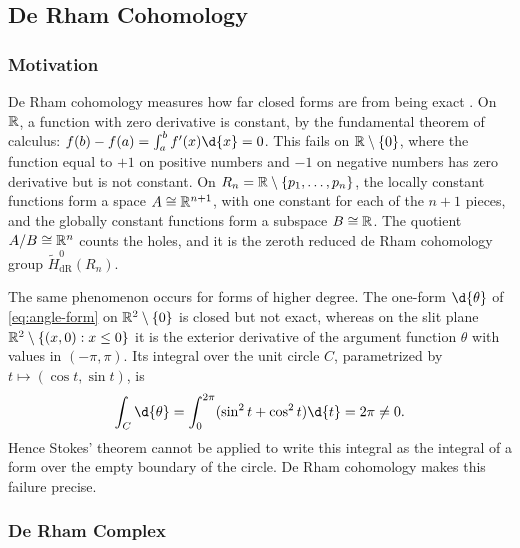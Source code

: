 \documentclass[a4paper,12pt]{article}
\begin{document}
\subsection{De Rham Cohomology}\label{subsec:de_rham_theory:de_rham_cohomology}

\subsubsection{Motivation}\label{subsubsec:de_rham_theory:de_rham_cohomology:motivation}

De Rham cohomology measures how far closed forms are from being exact \cite{tao2008differential}.
On $\mathbb{R}$, a function with zero derivative is constant, by the fundamental theorem of calculus: $f(b) - f(a) = \int_a^b f'(x) \d{x} = 0$.
This fails on $\mathbb{R} \setminus \{0\}$, where the function equal to $+1$ on positive numbers and $-1$ on negative numbers has zero derivative but is not constant.
On $R_n = \mathbb{R} \setminus \{p_1, \ldots, p_n\}$, the locally constant functions form a space $A \cong \mathbb{R}^{n+1}$, with one constant for each of the $n+1$ pieces, and the globally constant functions form a subspace $B \cong \mathbb{R}$.
The quotient $A/B \cong \mathbb{R}^n$ counts the holes, and it is the zeroth reduced de Rham cohomology group $\widetilde{H}^0_{\mathrm{dR}}(R_n)$.

The same phenomenon occurs for forms of higher degree.
The one-form $\d{\theta}$ of \eqref{eq:angle-form} on $\mathbb{R}^2 \setminus \{0\}$ is closed but not exact, whereas on the slit plane $\mathbb{R}^2 \setminus \{(x, 0) : x \leq 0\}$ it is the exterior derivative of the argument function $\theta$ with values in $(-\pi, \pi)$.
Its integral over the unit circle $C$, parametrized by $t \mapsto (\cos t, \sin t)$, is
\begin{equation*}
    \int_C \d{\theta} = \int_0^{2\pi} (\sin^2 t + \cos^2 t) \d{t} = 2\pi \neq 0.
\end{equation*}
Hence Stokes' theorem cannot be applied to write this integral as the integral of a form over the empty boundary of the circle.
De Rham cohomology makes this failure precise.

\subsubsection{De Rham Complex}\label{subsubsec:de_rham_theory:de_rham_cohomology:de_rham_complex}
\end{document}
